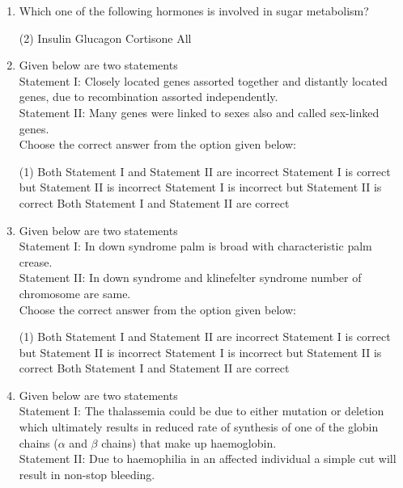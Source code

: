 \documentclass[twocolumn]{article}
\begin{document}
\begin{enumerate}
    \item Which one of the following hormones is involved in sugar metabolism?
        \begin{tasks}(2)
            \task Insulin
            \task Glucagon
            \task Cortisone
            \task All
        \end{tasks}
    \item Given below are two statements\\
    Statement I: Closely located genes assorted together and distantly located genes, due to recombination assorted independently.\\
    Statement II: Many genes were linked to sexes also and called sex-linked genes.\\
    Choose the correct answer from the option given below:
        \begin{tasks}(1)
            \task Both Statement I and Statement II are incorrect
            \task Statement I is correct but Statement II is incorrect
            \task Statement I is incorrect but Statement II is correct
            \task Both Statement I and Statement II are correct
        \end{tasks}
    \item Given below are two statements\\
    Statement I: In down syndrome palm is broad with characteristic palm crease.\\
    Statement II: In down syndrome and klinefelter syndrome number of chromosome are same.\\
    Choose the correct answer from the option given below:
        \begin{tasks}(1)
            \task Both Statement I and Statement II are incorrect
            \task Statement I is correct but Statement II is incorrect
            \task Statement I is incorrect but Statement II is correct
            \task Both Statement I and Statement II are correct
        \end{tasks}
    \item Given below are two statements\\
    Statement I: The thalassemia could be due to either mutation or deletion which ultimately results in reduced rate of synthesis of one of the globin chains (\(\alpha\) and \(\beta\) chains) that make up haemoglobin.\\
    Statement II: Due to haemophilia in an affected individual a simple cut will result in non-stop bleeding.\\

\end{enumerate}
\end{document}
